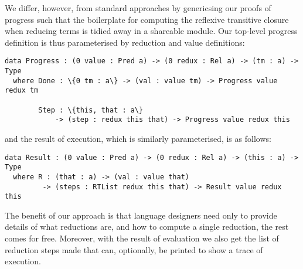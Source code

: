 We differ, however, from standard approaches by genericsing our proofs of progress such that the boilerplate for computing the reflexive transitive closure when reducing terms is tidied away in a shareable module.
%
Our top-level progress definition is thus parameterised by reduction and value definitions:

\begin{Verbatim}
data Progress : (0 value : Pred a) -> (0 redux : Rel a) -> (tm : a) -> Type
  where Done : \{0 tm : a\} -> (val : value tm) -> Progress value redux tm

        Step : \{this, that : a\}
            -> (step : redux this that) -> Progress value redux this
\end{Verbatim}

\noindent
and the result of execution, which is similarly parameterised, is as follows:

\begin{Verbatim}
data Result : (0 value : Pred a) -> (0 redux : Rel a) -> (this : a) -> Type
  where R : (that : a) -> (val : value that)
         -> (steps : RTList redux this that) -> Result value redux this
\end{Verbatim}

The benefit of our approach is that language designers need only to provide details of what reductions are, and how to compute a single reduction, the rest comes for free.
%
Moreover, with the result of evaluation we also get the list of reduction steps made that can, optionally, be printed to show a trace of execution.

